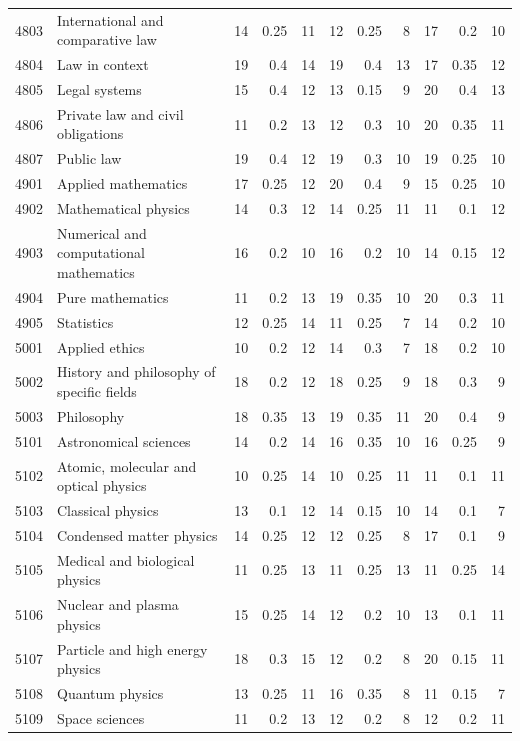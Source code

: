\begin{longtable}{r p{2.15cm} rrr rrr rrr}
4803 & International and comparative law & 14 & 0.25 & 11 & 12 & 0.25 & 8 & 17 & 0.2 & 10 \\
4804 & Law in context & 19 & 0.4 & 14 & 19 & 0.4 & 13 & 17 & 0.35 & 12 \\
4805 & Legal systems & 15 & 0.4 & 12 & 13 & 0.15 & 9 & 20 & 0.4 & 13 \\
4806 & Private law and civil obligations & 11 & 0.2 & 13 & 12 & 0.3 & 10 & 20 & 0.35 & 11 \\
4807 & Public law & 19 & 0.4 & 12 & 19 & 0.3 & 10 & 19 & 0.25 & 10 \\
4901 & Applied mathematics & 17 & 0.25 & 12 & 20 & 0.4 & 9 & 15 & 0.25 & 10 \\
4902 & Mathematical physics & 14 & 0.3 & 12 & 14 & 0.25 & 11 & 11 & 0.1 & 12 \\
4903 & Numerical and computational mathematics & 16 & 0.2 & 10 & 16 & 0.2 & 10 & 14 & 0.15 & 12 \\
4904 & Pure mathematics & 11 & 0.2 & 13 & 19 & 0.35 & 10 & 20 & 0.3 & 11 \\
4905 & Statistics & 12 & 0.25 & 14 & 11 & 0.25 & 7 & 14 & 0.2 & 10 \\
5001 & Applied ethics & 10 & 0.2 & 12 & 14 & 0.3 & 7 & 18 & 0.2 & 10 \\
5002 & History and philosophy of specific fields & 18 & 0.2 & 12 & 18 & 0.25 & 9 & 18 & 0.3 & 9 \\
5003 & Philosophy & 18 & 0.35 & 13 & 19 & 0.35 & 11 & 20 & 0.4 & 9 \\
5101 & Astronomical sciences & 14 & 0.2 & 14 & 16 & 0.35 & 10 & 16 & 0.25 & 9 \\
5102 & Atomic, molecular and optical physics & 10 & 0.25 & 14 & 10 & 0.25 & 11 & 11 & 0.1 & 11 \\
5103 & Classical physics & 13 & 0.1 & 12 & 14 & 0.15 & 10 & 14 & 0.1 & 7 \\
5104 & Condensed matter physics & 14 & 0.25 & 12 & 12 & 0.25 & 8 & 17 & 0.1 & 9 \\
5105 & Medical and biological physics & 11 & 0.25 & 13 & 11 & 0.25 & 13 & 11 & 0.25 & 14 \\
5106 & Nuclear and plasma physics & 15 & 0.25 & 14 & 12 & 0.2 & 10 & 13 & 0.1 & 11 \\
5107 & Particle and high energy physics & 18 & 0.3 & 15 & 12 & 0.2 & 8 & 20 & 0.15 & 11 \\
5108 & Quantum physics & 13 & 0.25 & 11 & 16 & 0.35 & 8 & 11 & 0.15 & 7 \\
5109 & Space sciences & 11 & 0.2 & 13 & 12 & 0.2 & 8 & 12 & 0.2 & 11 \\

\end{longtable}
